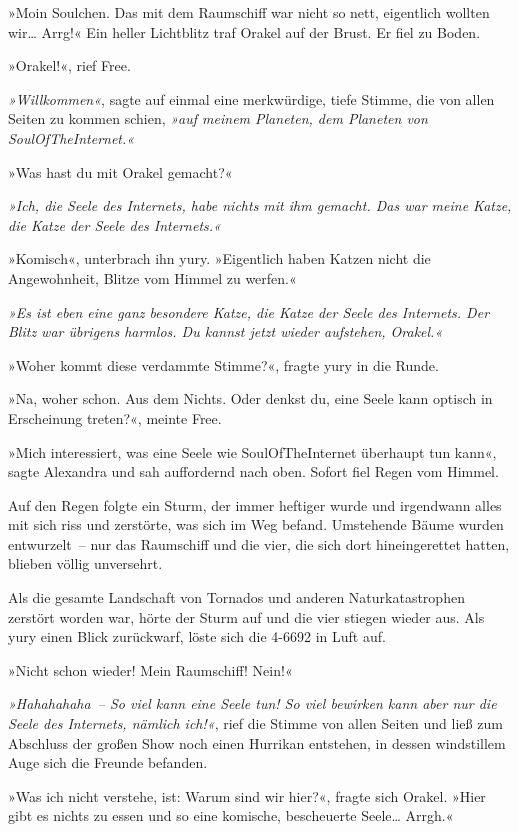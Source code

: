 »Moin Soulchen. Das mit dem Raumschiff war nicht so nett, eigentlich wollten wir… Arrg!« Ein heller Lichtblitz traf Orakel auf der Brust. Er fiel zu Boden.

»Orakel!«, rief Free.

\textit{»Willkommen«}, sagte auf einmal eine merkwürdige, tiefe Stimme, die von allen Seiten zu kommen schien, \textit{»auf meinem Planeten, dem Planeten von SoulOfTheInternet.«}

»Was hast du mit Orakel gemacht?«

\textit{»Ich, die Seele des Internets, habe nichts mit ihm gemacht. Das war meine Katze, die Katze der Seele des Internets.«}

»Komisch«, unterbrach ihn yury. »Eigentlich haben Katzen nicht die Angewohnheit, Blitze vom Himmel zu werfen.«

\textit{»Es ist eben eine ganz besondere Katze, die Katze der Seele des Internets. Der Blitz war übrigens harmlos. Du kannst jetzt wieder aufstehen, Orakel.«}

»Woher kommt diese verdammte Stimme?«, fragte yury in die Runde.

»Na, woher schon. Aus dem Nichts. Oder denkst du, eine Seele kann optisch in Erscheinung treten?«, meinte Free.

»Mich interessiert, was eine Seele wie SoulOfTheInternet überhaupt tun kann«, sagte Alexandra und sah auffordernd nach oben. Sofort fiel Regen vom Himmel.

Auf den Regen folgte ein Sturm, der immer heftiger wurde und irgendwann alles mit sich riss und zerstörte, was sich im Weg befand. Umstehende Bäume wurden entwurzelt~– nur das Raumschiff und die vier, die sich dort hineingerettet hatten, blieben völlig unversehrt.

Als die gesamte Landschaft von Tornados und anderen Naturkatastrophen zerstört worden war, hörte der Sturm auf und die vier stiegen wieder aus. Als yury einen Blick zurückwarf, löste sich die 4-6692 in Luft auf.

»Nicht schon wieder! Mein Raumschiff! Nein!«

\textit{»Hahahahaha~– So viel kann eine Seele tun! So viel bewirken kann aber nur die Seele des Internets, nämlich ich!«}, rief die Stimme von allen Seiten und ließ zum Abschluss der großen Show noch einen Hurrikan entstehen, in dessen windstillem Auge sich die Freunde befanden.

»Was ich nicht verstehe, ist: Warum sind wir hier?«, fragte sich Orakel. »Hier gibt es nichts zu essen und so eine komische, bescheuerte Seele… Arrgh.«

